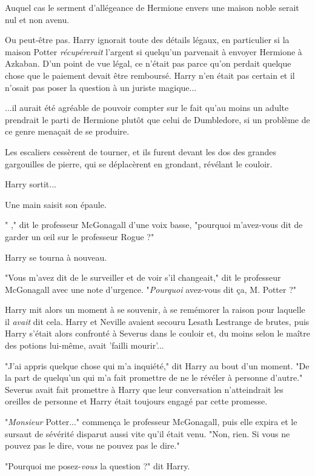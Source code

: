 Auquel cas le serment d'allégeance de Hermione envers une maison noble serait nul et non avenu.

Ou peut-être pas. Harry ignorait toute des détails légaux, en particulier si la maison Potter \emph{récupérerait } l'argent si quelqu'un parvenait à envoyer Hermione à Azkaban. D'un point de vue légal, ce n'était pas parce qu'on perdait quelque chose que le paiement devait être remboursé. Harry n'en était pas certain et il n'osait pas poser la question à un juriste magique...

...il aurait été agréable de pouvoir compter sur le fait qu'au moins un adulte prendrait le parti de Hermione plutôt que celui de Dumbledore, si un problème de ce genre menaçait de se produire.

Les escaliers cessèrent de tourner, et ils furent devant les dos des grandes gargouilles de pierre, qui se déplacèrent en grondant, révélant le couloir.

Harry sortit...

Une main saisit son épaule.

" ," dit le professeur McGonagall d'une voix basse, "pourquoi m'avez-vous dit de garder un œil sur le professeur Rogue ?"

Harry se tourna à nouveau.

"Vous m'avez dit de le surveiller et de voir s'il changeait," dit le professeur McGonagall avec une note d'urgence. "\emph{Pourquoi}  avez-vous dit ça, M. Potter ?"

Harry mit alors un moment à se souvenir, à se remémorer la raison pour laquelle il \emph{avait}  dit cela. Harry et Neville avaient secouru Lesath Lestrange de brutes, puis Harry s'était alors confronté à Severus dans le couloir et, du moins selon le maître des potions lui-même, avait 'failli mourir'...

"J'ai appris quelque chose qui m'a inquiété," dit Harry au bout d'un moment. "De la part de quelqu'un qui m'a fait promettre de ne le révéler à personne d'autre." Severus avait fait promettre à Harry que leur conversation n'atteindrait les oreilles de personne et Harry était toujours engagé par cette promesse.

"\emph{Monsieur}  Potter..." commença le professeur McGonagall, puis elle expira et le sursaut de sévérité disparut aussi vite qu'il était venu. "Non, rien. Si vous ne pouvez pas le dire, vous ne pouvez pas le dire."

"Pourquoi me posez-\emph{vous}  la question ?" dit Harry.


